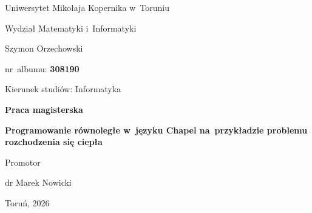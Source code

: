 \documentclass[12pt,a4paper]{report}
\title{\thesistitle}
\author{\thesisauthor}
\date{\thesisyear}
\newcommand{\thesistitle}{Programowanie równoległe w~języku Chapel na~przykładzie problemu rozchodzenia się ciepła}
\newcommand{\thesisauthor}{Szymon Orzechowski}
\newcommand{\thesissupervisor}{dr Marek Nowicki}
\newcommand{\thesisyear}{2026}
\begin{document}
\begin{titlepage}
\centering
\vspace*{0.6cm}
{\large Uniwersytet Mikołaja Kopernika w~Toruniu\par}
\vspace{0.3cm}
{\large Wydział Matematyki i~Informatyki\par}
\vspace{2.6cm}
{\large \thesisauthor\par}
\vspace{0.25cm}
{\large nr~albumu: \textbf{308190}\par}
\vspace{0.25cm}
{\large Kierunek studiów: Informatyka\par}
\vspace{2cm}
{\Large\bfseries Praca magisterska\par}
\vspace{1.6cm}
{\Large\bfseries \thesistitle\par}
\vfill
{\large Promotor\par}
\vspace{0.15cm}
{\large \thesissupervisor\par}
\vspace{1.2cm}
{\large Toruń, \thesisyear\par}
\end{titlepage}
\cleardoublepage

\tableofcontents









\end{document}
